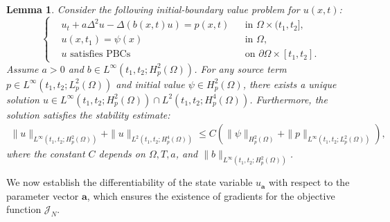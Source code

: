 \documentclass[11pt,reqno]{amsart}
\newtheorem{lemma}[theorem]{Lemma}
\begin{document}
\begin{lemma}
	\label{lemma:well_posedness_four_order}
	Consider the following initial-boundary value problem for $u(x,t)$:
	\begin{equation}
		\label{equ:linear CH}
		\left\{
		\begin{aligned}
			&u_{t} + a\Delta^2 u - \Delta (b(x,t)u) = p(x,t) && \text{in }  \Omega \times (t_1,t_2], \\
			&u(x,t_1) = \psi(x) && \text{in } \Omega, \\
			&u \text{ satisfies PBCs} && \text{on } \partial\Omega \times [t_1,t_2].
		\end{aligned}
		\right.
	\end{equation}
	Assume $a > 0$ and $b \in L^{\infty}(t_1,t_2; H_p^2(\Omega))$. For any source term $p \in L^{\infty}(t_1,t_2; L_p^{2}(\Omega))$ and initial value $\psi \in H_p^2(\Omega)$, there exists a unique solution $u \in L^{\infty}(t_1,t_2; H_p^2(\Omega)) \cap L^2(t_1,t_2; H^4_p(\Omega))$. Furthermore, the solution satisfies the stability estimate:
	\begin{align*}
		\|u\|_{L^{\infty}(t_1,t_2; H_p^2(\Omega))} + \|u\|_{L^2(t_1,t_2; H^4_p(\Omega))} \leq C \left( \|\psi\|_{H_p^2(\Omega)} + \|p\|_{L^{\infty}(t_1,t_2; L_p^{2}(\Omega))} \right),
	\end{align*}
	where the constant $C$ depends on $\Omega, T, a$, and $\|b\|_{L^{\infty}(t_1,t_2; H_p^2(\Omega))}$.
\end{lemma}

We now establish the differentiability of the state variable $u_{\mathbf{a}}$ with respect to the parameter vector $\mathbf{a}$, which ensures the existence of gradients for the objective function $\mathcal{J}_N$.
\end{document}
